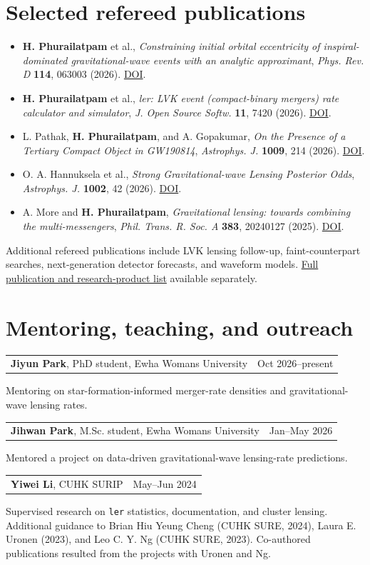 \documentclass[10pt]{article}
\makeatletter
\newcommand{\dated}[2]{\par\noindent\begin{tabularx}{\linewidth}{@{}X r@{}}#1&#2\end{tabularx}\par}
\makeatother
\begin{document}
\section*{Selected refereed publications}
\begin{itemize}
\item \textbf{H. Phurailatpam} et al., \textit{Constraining initial orbital eccentricity of inspiral-dominated gravitational-wave events with an analytic approximant}, \textit{Phys. Rev. D} \textbf{114}, 063003 (2026). \href{https://doi.org/10.1103/94fx-wnjx}{DOI}.
\item \textbf{H. Phurailatpam} et al., \textit{ler: LVK event (compact-binary mergers) rate calculator and simulator}, \textit{J. Open Source Softw.} \textbf{11}, 7420 (2026). \href{https://doi.org/10.21105/joss.07420}{DOI}.
\item L. Pathak, \textbf{H. Phurailatpam}, and A. Gopakumar, \textit{On the Presence of a Tertiary Compact Object in GW190814}, \textit{Astrophys. J.} \textbf{1009}, 214 (2026). \href{https://doi.org/10.3847/1538-4357/ae9cae}{DOI}.
\item O. A. Hannuksela et al., \textit{Strong Gravitational-wave Lensing Posterior Odds}, \textit{Astrophys. J.} \textbf{1002}, 42 (2026). \href{https://doi.org/10.3847/1538-4357/ae5816}{DOI}.
\item A. More and \textbf{H. Phurailatpam}, \textit{Gravitational lensing: towards combining the multi-messengers}, \textit{Phil. Trans. R. Soc. A} \textbf{383}, 20240127 (2025). \href{https://doi.org/10.1098/rsta.2024.0127}{DOI}.
\end{itemize}
Additional refereed publications include LVK lensing follow-up, faint-counterpart searches, next-generation detector forecasts, and waveform models. \href{https://github.com/hemantaph/resume/blob/main/KALVI_application/Publication_List_IPMU.pdf}{Full publication and research-product list} available separately.
\section*{Mentoring, teaching, and outreach}
\dated{\textbf{Jiyun Park}, PhD student, Ewha Womans University}{Oct 2026--present}
Mentoring on star-formation-informed merger-rate densities and gravitational-wave lensing rates.
\dated{\textbf{Jihwan Park}, M.Sc. student, Ewha Womans University}{Jan--May 2026}
Mentored a project on data-driven gravitational-wave lensing-rate predictions.
\dated{\textbf{Yiwei Li}, CUHK SURIP}{May--Jun 2024}
Supervised research on \texttt{ler} statistics, documentation, and cluster lensing.
Additional guidance to Brian Hiu Yeung Cheng (CUHK SURE, 2024), Laura E. Uronen (2023), and Leo C. Y. Ng (CUHK SURE, 2023). Co-authored publications resulted from the projects with Uronen and Ng.
\end{document}

